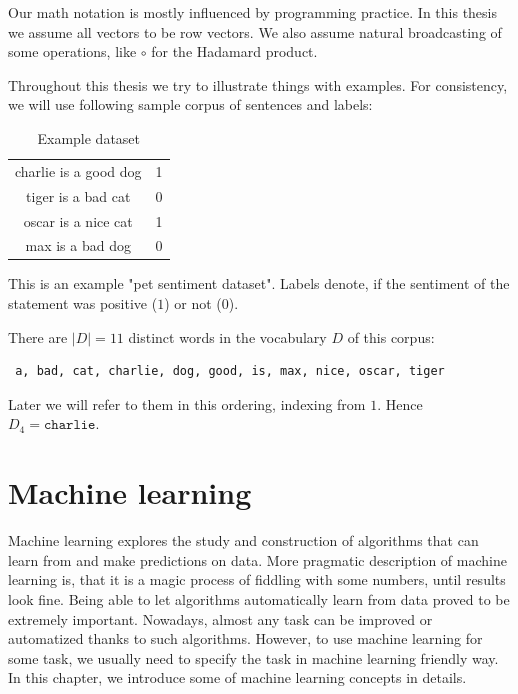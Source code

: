     Our math notation is mostly influenced by programming practice.
    In this thesis we assume all vectors to be row vectors.
    We also assume natural broadcasting of some operations, like $\circ$ for the Hadamard product.
    
    Throughout this thesis we try to illustrate things with examples. 
    For consistency, we will use following sample corpus of sentences and labels:
    
    \begin{table}[h]
        \centering
        \begin{tabular}{c|c}
        \hline
            charlie is a good dog & 1 \\
            tiger is a bad cat & 0 \\
            oscar is a nice cat & 1 \\
            max is a bad dog & 0 \\
        \end{tabular}
        \caption{Example dataset}
        \label{tab:example:dataset}

    \end{table}
    
    This is an example "pet sentiment dataset". Labels denote, if the sentiment of the statement was positive ($1$) or not ($0$). 

    There are $|D|=11$ distinct words in the vocabulary $D$ of this corpus: 
    \begin{verbatim} a, bad, cat, charlie, dog, good, is, max, nice, oscar, tiger \end{verbatim}
    
    Later we will refer to them in this ordering, indexing from $1$. 
    Hence $D_4=\mathtt{charlie}$.


\section{Machine learning}
    
    Machine learning explores the study and construction of algorithms that can learn from and make predictions on data.
    More pragmatic description of machine learning is, that it is a magic process of fiddling with some numbers, until results look fine. \*%
    Being able to let algorithms automatically learn from data proved to be extremely important.
    Nowadays, almost any task can be improved or automatized thanks to such algorithms. 
    However, to use machine learning for some task, we usually need to specify the task in machine learning friendly way.    
    In this chapter, we introduce some of machine learning concepts in details.


